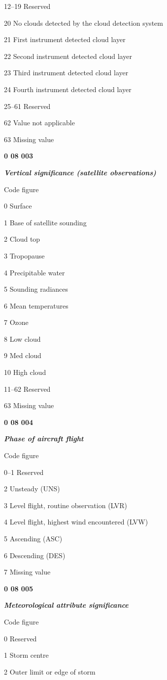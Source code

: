 12--19 Reserved

20 No clouds detected by the cloud detection system

21 First instrument detected cloud layer

22 Second instrument detected cloud layer

23 Third instrument detected cloud layer

24 Fourth instrument detected cloud layer

25--61 Reserved

62 Value not applicable

63 Missing value

\textbf{0 08 003}

\emph{\textbf{Vertical significance (satellite observations)}}

Code figure

0 Surface

1 Base of satellite sounding

2 Cloud top

3 Tropopause

4 Precipitable water

5 Sounding radiances

6 Mean temperatures

7 Ozone

8 Low cloud

9 Med cloud

10 High cloud

11--62 Reserved

63 Missing value

\textbf{0 08 004}

\emph{\textbf{Phase of aircraft flight}}

Code figure

0--1 Reserved

2 Unsteady (UNS)

3 Level flight, routine observation (LVR)

4 Level flight, highest wind encountered (LVW)

5 Ascending (ASC)

6 Descending (DES)

7 Missing value

\textbf{0 08 005}

\emph{\textbf{Meteorological attribute significance}}

Code figure

0 Reserved

1 Storm centre

2 Outer limit or edge of storm

